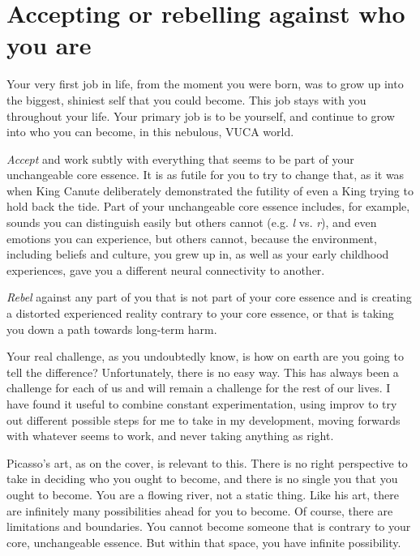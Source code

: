 \section{Accepting or rebelling against who you are}
Your very first job in life, from the moment you were born, was to grow up into the biggest, shiniest self that you could become. This job stays with you throughout your life. Your primary job is to be yourself, and continue to grow into who you can become, in this nebulous, VUCA world. 


\emph{Accept} and work subtly with everything that seems to be part of your unchangeable core essence. It is as futile for you to try to change that, as it was when King Canute deliberately demonstrated the futility of even a King trying to hold back the tide. Part of your unchangeable core essence includes, for example, sounds you can distinguish easily but others cannot (e.g. \emph{l} vs. \emph{r}), and even emotions you can experience, but others cannot, because the environment, including beliefs and culture, you grew up in, as well as your early childhood experiences, gave you a different neural connectivity to another. 


\emph{Rebel} against any part of you that is not part of your core essence and is creating a distorted experienced reality contrary to your core essence, or that is taking you down a path towards long-term harm.


Your real challenge, as you undoubtedly know, is how on earth are you going to tell the difference? Unfortunately, there is no easy way. This has always  been a challenge for each of us and will remain a challenge for the rest of our lives. I have found it useful to combine constant experimentation, using improv to try out different possible steps for me to take in my development, moving forwards with whatever seems to work, and never taking anything as right.


Picasso's art, as on the cover, is relevant to this. There is no right perspective to take in deciding who you ought to become, and there is no single you that you ought to become. You are a flowing river, not a static thing. Like his art, there are infinitely many possibilities ahead for you to become. Of course, there are limitations and boundaries. You cannot become someone that is contrary to your core, unchangeable essence. But within that space, you have infinite possibility.


